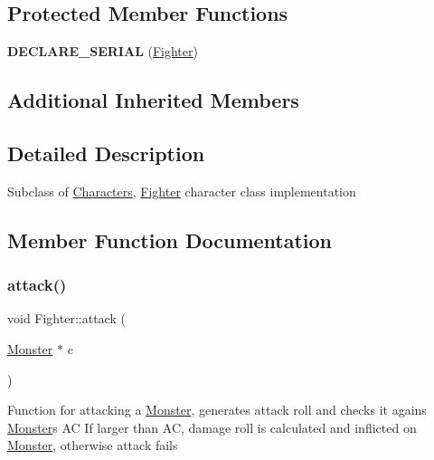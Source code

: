 \subsection*{Protected Member Functions}
\begin{DoxyCompactItemize}
\item 
\hypertarget{class_fighter_a349455a2930ba35778477b876c5ea0eb}{}\label{class_fighter_a349455a2930ba35778477b876c5ea0eb} 
{\bfseries D\+E\+C\+L\+A\+R\+E\+\_\+\+S\+E\+R\+I\+AL} (\hyperlink{class_fighter}{Fighter})
\end{DoxyCompactItemize}
\subsection*{Additional Inherited Members}


\subsection{Detailed Description}
Subclass of \hyperlink{class_characters}{Characters}, \textquotesingle{}\hyperlink{class_fighter}{Fighter}\textquotesingle{} character class implementation 

\subsection{Member Function Documentation}
\hypertarget{class_fighter_ac1a886e2f60333e38e90fff2a0f6107b}{}\label{class_fighter_ac1a886e2f60333e38e90fff2a0f6107b} 
\subsubsection{\texorpdfstring{attack()}{attack()}}
{\footnotesize\ttfamily void Fighter\+::attack (\begin{DoxyParamCaption}\item[{\hyperlink{class_monster}{Monster} $\ast$}]{c }\end{DoxyParamCaption})}

Function for attacking a \hyperlink{class_monster}{Monster}, generates attack roll and checks it agains \hyperlink{class_monster}{Monster}\textquotesingle{}s AC If larger than AC, damage roll is calculated and inflicted on \hyperlink{class_monster}{Monster}, otherwise attack fails \hypertarget{class_fighter_acabd4955401ddf3ddc0be5f28fa64267}{}\label{class_fighter_acabd4955401ddf3ddc0be5f28fa64267} 
